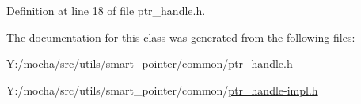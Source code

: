 Definition at line 18 of file ptr\_\-handle.h.



The documentation for this class was generated from the following files:\begin{DoxyCompactItemize}
\item 
Y:/mocha/src/utils/smart\_\-pointer/common/\hyperlink{ptr__handle_8h}{ptr\_\-handle.h}\item 
Y:/mocha/src/utils/smart\_\-pointer/common/\hyperlink{ptr__handle-impl_8h}{ptr\_\-handle-\/impl.h}\end{DoxyCompactItemize}
